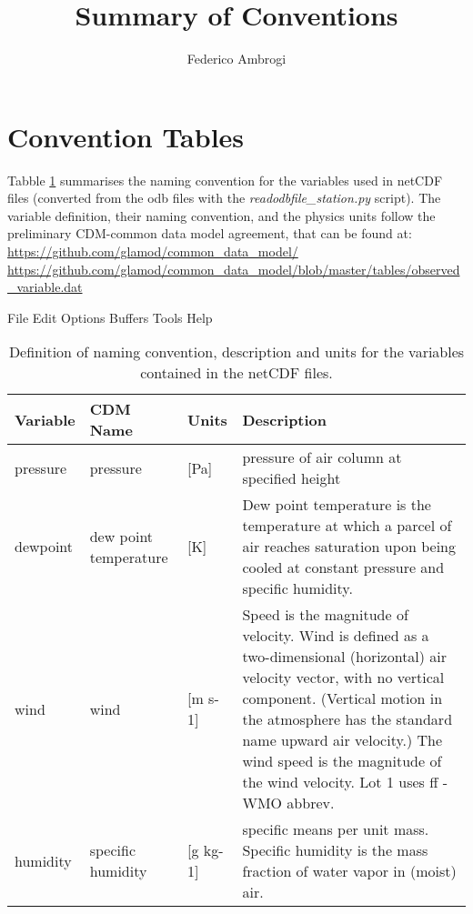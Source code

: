 \documentclass[a4paper,11pt]{article}
\author[a]{Federico Ambrogi}
\title{\boldmath Summary of Conventions}
\begin{document}
 
	\sffamily
	\maketitle
	
	
	
	
\section{Convention Tables}
Tabble \ref{CDM} summarises the naming convention for the variables used in netCDF files (converted from the odb files with the \textit{readodbfile\_station.py} script).
The variable definition, their naming convention, and the physics units follow the preliminary CDM-common data model agreement, that can be found at:
\newline
\url{https://github.com/glamod/common_data_model/}
\newline
\url{https://github.com/glamod/common_data_model/blob/master/tables/observed_variable.dat}




File Edit Options Buffers Tools Help
\begin{table}[!htbp]
	\footnotesize
	\begin{center}
		\renewcommand{\arraystretch}{1.3}
		\begin{tabular}{ l l l p{3.5in}}
			\toprule
			\textbf{Variable} & \textbf{CDM Name} & \textbf{Units} & \textbf{Description}  \\ \toprule \toprule
			pressure & pressure & [Pa] & pressure of air column at specified height\\
			dewpoint & dew point temperature & [K] & Dew point temperature is the temperature at which a parcel of air reaches saturation upon being cooled at constant pressure and specific humidity.\\
			wind & wind & [m s-1] & Speed is the magnitude of velocity. Wind is defined as a two-dimensional (horizontal) air velocity vector,  with no vertical component. (Vertical motion in the atmosphere has the standard name upward air velocity.) The wind speed is the magnitude of the wind velocity. Lot 1 uses ff  - WMO abbrev.\\
			humidity & specific humidity & [g kg-1] & specific means per unit mass. Specific humidity is the mass fraction of water vapor in (moist) air.\\
			\bottomrule \bottomrule
		\end{tabular}
	\end{center}
	\caption{Definition of naming convention, description and units for the variables contained in the netCDF files.}
	\label{CDM}
\end{table}





%
%
\end{document}
